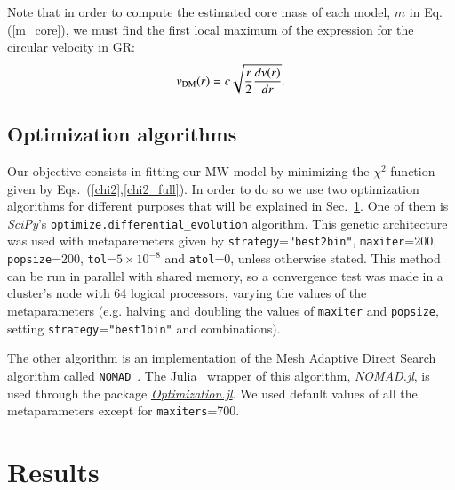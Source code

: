 \documentclass[twocolumn]{aa}
\begin{document}
Note that in order to compute the estimated core mass of each model, $m$ in Eq.(\ref{m_core}),
we must find the first local maximum of the expression for the circular velocity in GR:
\begin{equation}
   \label{v_circ_dm}
   v_{\rm{DM}}(r)= c\sqrt{\frac{r}{2}\frac{d\nu(r)}{dr}}.
\end{equation}

\subsection{Optimization algorithms}
\label{sec:optimization}

Our objective consists in fitting our MW model by minimizing the $\chi^2$ function given by Eqs.~(\ref{chi2},\ref{chi2_full}).  In order to do so we use two optimization algorithms for different purposes
that will be explained in Sec.~\ref{sec:results}.
One of them is {\it SciPy}'s
\texttt{optimize.differential\_evolution} algorithm. This genetic architecture
was used with metaparemeters given by
\texttt{strategy}=\texttt{"best2bin"}, \texttt{maxiter}=200, \texttt{popsize}=200,
\texttt{tol}=$5\times10^{-8}$ and \texttt{atol}=0, unless otherwise stated. This method can be run in parallel with shared memory,
so a convergence test was made in a cluster's node with 64 logical processors, varying the values of the metaparameters (e.g. halving and doubling the values of \texttt{maxiter} and \texttt{popsize}, setting \texttt{strategy}=\texttt{"best1bin"} and combinations).

The other algorithm is an implementation of the Mesh Adaptive Direct Search algorithm called
\texttt{NOMAD}~\citep{audet2021nomad}. The {\sc Julia}~\citep{bezanson2017julia}
wrapper of this algorithm, \href{https://bbopt.github.io/NOMAD.jl/stable/}{\it NOMAD.jl},
is used through the package \href{https://docs.sciml.ai/Optimization/stable/}{\it Optimization.jl}.
We used default values of all the metaparameters except for \texttt{maxiters}=700.




\section{Results}
\label{sec:results}
\end{document}
